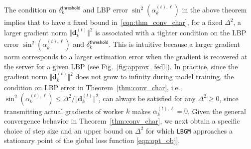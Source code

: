 \documentclass{article}
\renewcommand{\vec}[3]{\boldsymbol{#1}_{#2}^{#3}}
\newcommand{\subsup}[3]{#1_{#2}^{#3}}
\newcommand{\innorm}[2]{\Vert #1\Vert_{#2}}
\newcommand{\algName}{{\tt LBGM}}
\begin{document}
The condition on $\delta^{\mathsf{threshold}}_k$ and LBP error $\sin^2(\subsup{\alpha}{k}{(t), \ell})$ in the above theorem implies that to have a fixed bound in~\eqref{eqn:thm_conv_char}, for a fixed $\Delta^2$, a larger gradient norm $\innorm{\vec{d}{k}{(t)}}{}^2$ is associated with a tighter condition on the LBP error $\sin^2(\subsup{\alpha}{k}{(t), \ell})$ and  $\subsup{\delta}{k}{\mathsf{threshold}}$. This is intuitive because a larger gradient norm corresponds to a larger estimation error when the gradient is recovered at the server for a given LBP (see Fig.~\ref{fig:approx_fedl}). In practice, since the gradient norm $\innorm{\vec{d}{k}{(t)}}{}^2$ does not grow to infinity during model training, the condition on LBP error in Theorem~\ref{thm:conv_char}, i.e., $ \sin^2(\subsup{\alpha}{k}{(t), \ell}) \leq \Delta^2/\innorm{\vec{d}{k}{(t)}}{}^2$, can always be satisfied for any $\Delta^2\geq 0$, since transmitting actual gradients of worker $k$ makes $\subsup{\alpha}{k}{(t), \ell}=0$. Given the general convergence behavior in Theorem~\ref{thm:conv_char}, we next obtain a specific choice of step size and an upper bound on $\Delta^2$ for which {\algName} approaches a stationary point of the global loss function \eqref{eqn:opt_obj}.

\end{document}
